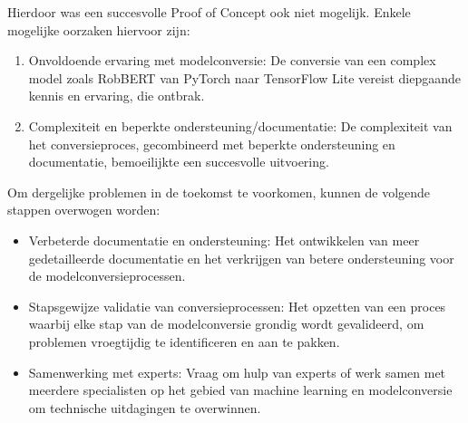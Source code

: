Hierdoor was een succesvolle Proof of Concept ook niet mogelijk. Enkele mogelijke oorzaken hiervoor zijn:

\begin{enumerate}
    \item Onvoldoende ervaring met modelconversie: De conversie van een complex model zoals RobBERT van PyTorch naar TensorFlow Lite vereist diepgaande kennis en ervaring, die ontbrak.
    \item Complexiteit en beperkte ondersteuning/documentatie: De complexiteit van het conversieproces, gecombineerd met beperkte ondersteuning en documentatie, bemoeilijkte een succesvolle uitvoering.
\end{enumerate}

Om dergelijke problemen in de toekomst te voorkomen, kunnen de volgende stappen overwogen worden:

\begin{itemize}
    \item Verbeterde documentatie en ondersteuning: Het ontwikkelen van meer gedetailleerde documentatie en het verkrijgen van betere ondersteuning voor de modelconversieprocessen.
    \item Stapsgewijze validatie van conversieprocessen: Het opzetten van een proces waarbij elke stap van de modelconversie grondig wordt gevalideerd, om problemen vroegtijdig te identificeren en aan te pakken.
    \item Samenwerking met experts: Vraag om hulp van experts of werk samen met meerdere specialisten op het gebied van machine learning en modelconversie om technische uitdagingen te overwinnen.
\end{itemize}


